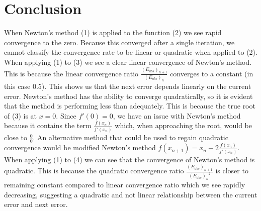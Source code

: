 \documentclass[12pt]{article}
\begin{document}
	\section{Conclusion}
	When Newton's method (1) is applied to the function (2) we see rapid convergence to the zero. Because this converged after a single iteration, we cannot classify the convergence rate to be linear or quadratic when applied to (2). When applying (1) to (3) we see a clear linear convergence of Newton's method. This is because the linear convergence ratio $\frac{(E_{abs})_{n+1}}{(E_{abs})_{n}}$ converges to a constant (in this case 0.5). This shows us that the next error depends linearly on the current error. Newton's method has the ability to converge quadratically, so it is evident that the method is performing less than adequately. This is because the true root of (3) is at $x = 0$. Since $f'(0) = 0$, we have  an issue with Newton's method because it contains the term $\frac{f(x_n)}{f'(x_n)}$ which, when approaching the root, would be close to $\frac{0}{0}$. An alternative method that could be used to regain quadratic convergence would be modified Newton's method $f(x_{n+1}) = x_n - 2{\frac{f(x_n)}{f'(x_n)}}$. When applying (1) to (4) we can see that the convergence of Newton's method is quadratic. This is because the quadratic convergence ratio $\frac{(E_{abs})_{n+1}}{{(E_{abs})_{n}}^2}$ is closer to remaining constant compared to linear convergence ratio which we see rapidly decreasing, suggesting a quadratic and not linear relationship between the current error and next error.
\end{document}
